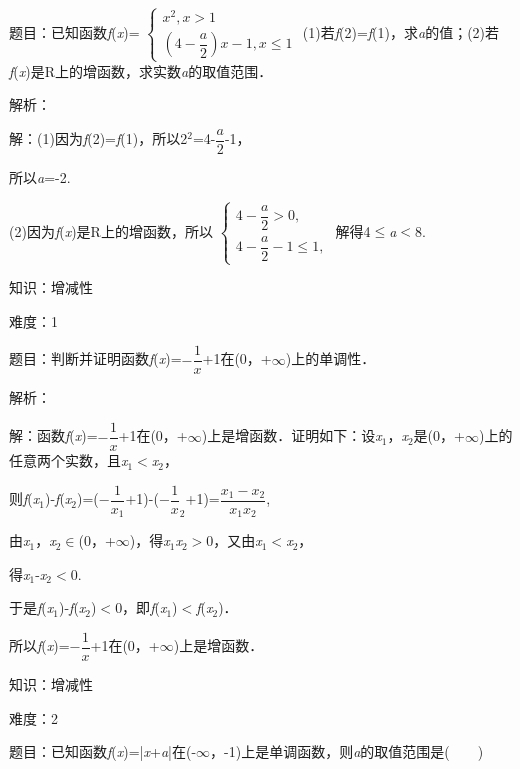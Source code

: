 \documentclass{article} %
\begin{document}
题目：已知函数\textit{f}(\textit{x})=
$\left\{
\begin{array}{l}
	x^{2}, x > 1\\
	(4-\dfrac{a}{2})x-1,  x \le 1
\end{array}
\right.$
(1)若\textit{f}(2)=\textit{f}(1)，求\textit{a}的值；(2)若\textit{f}(\textit{x})是R上的增函数，求实数\textit{a}的取值范围．

解析：

解：(1)因为\textit{f}(2)=\textit{f}(1)，所以2${}^{2}$=4-$\dfrac{a}{2}$-1，

所以\textit{a}=-2.

(2)因为\textit{f}(\textit{x})是R上的增函数，所以
$\left\{
\begin{array}{l}
	4-\dfrac{a}{2}>0, \\
	4-\dfrac{a}{2}-1\le 1,
\end{array}
\right.$
解得4$\mathrm{\le}$\textit{a}$\mathrm{<}$8.

知识：增减性

难度：1

题目：判断并证明函数\textit{f}(\textit{x})=$-\dfrac{1}{x}$+1在(0，+$\mathrm{\infty}$)上的单调性．

解析：

解：函数\textit{f}(\textit{x})=$-\dfrac{1}{x}$+1在(0，+$\mathrm{\infty}$)上是增函数．证明如下：设\textit{x}${}_{1}$，\textit{x}${}_{2}$是(0，+$\mathrm{\infty}$)上的任意两个实数，且\textit{x}${}_{1}$$\mathrm{<}$\textit{x}${}_{2}$，

则\textit{f}(\textit{x}${}_{1}$)-\textit{f}(\textit{x}${}_{2}$)=($-\dfrac{1}{x_{1}}$+1)-($-\dfrac{1}{x}_{2}$+1)=$\dfrac{x_{1}-x_{2}}{x_{1}x_{2}}$,

由\textit{x}${}_{1}$，\textit{x}${}_{2}$$\mathrm{\in}$(0，+$\mathrm{\infty}$)，得\textit{x}${}_{1}$\textit{x}${}_{2}$$\mathrm{>}$0，又由\textit{x}${}_{1}$$\mathrm{<}$\textit{x}${}_{2}$，

得\textit{x}${}_{1}$-\textit{x}${}_{2}$$\mathrm{<}$0.

于是\textit{f}(\textit{x}${}_{1}$)-\textit{f}(\textit{x}${}_{2}$)$\mathrm{<}$0，即\textit{f}(\textit{x}${}_{1}$)$\mathrm{<}$\textit{f}(\textit{x}${}_{2}$)．

所以\textit{f}(\textit{x})=$-\dfrac{1}{x}$+1在(0，+$\mathrm{\infty}$)上是增函数．

知识：增减性

难度：2

题目：已知函数\textit{f}(\textit{x})=|\textit{x}+\textit{a}|在(-$\mathrm{\infty}$，-1)上是单调函数，则\textit{a}的取值范围是(　　)
\end{document}
